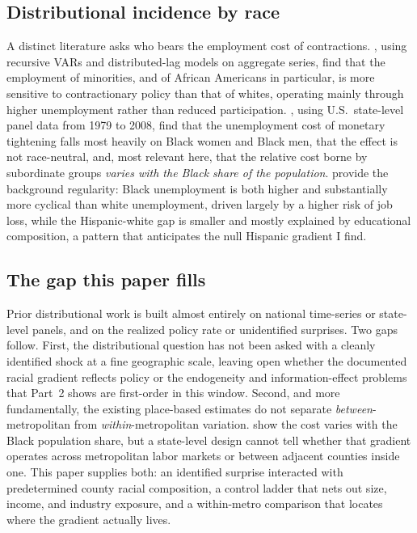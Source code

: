 \documentclass[11pt]{article}
\begin{document}
\subsection{Distributional incidence by race}
A distinct literature asks who bears the employment cost of contractions.
\citet{CarpenterRodgers2004}, using recursive VARs and distributed-lag models on aggregate
series, find that the employment of minorities, and of African Americans in particular, is
more sensitive to contractionary policy than that of whites, operating mainly through
higher unemployment rather than reduced participation. \citet{SeguinoHeintz2012}, using
U.S.\ state-level panel data from 1979 to 2008, find that the unemployment cost of monetary
tightening falls most heavily on Black women and Black men, that the effect is not
race-neutral, and, most relevant here, that the relative cost borne by subordinate groups
\emph{varies with the Black share of the population}. \citet{CajnerEtAl2017} provide the
background regularity: Black unemployment is both higher and substantially more cyclical
than white unemployment, driven largely by a higher risk of job loss, while the
Hispanic-white gap is smaller and mostly explained by educational composition, a pattern
that anticipates the null Hispanic gradient I find.

\subsection{The gap this paper fills}
Prior distributional work is built almost entirely on national time-series or state-level
panels, and on the realized policy rate or unidentified surprises. Two gaps follow. First,
the distributional question has not been asked with a cleanly identified shock at a fine
geographic scale, leaving open whether the documented racial gradient reflects policy or
the endogeneity and information-effect problems that Part~2 shows are first-order in this
window. Second, and more fundamentally, the existing place-based estimates do not separate
\emph{between}-metropolitan from \emph{within}-metropolitan variation. \citet{SeguinoHeintz2012}
show the cost varies with the Black population share, but a state-level design cannot tell
whether that gradient operates across metropolitan labor markets or between adjacent
counties inside one. This paper supplies both: an identified surprise interacted with
predetermined county racial composition, a control ladder that nets out size, income, and
industry exposure, and a within-metro comparison that locates where the gradient actually
lives.
\end{document}
